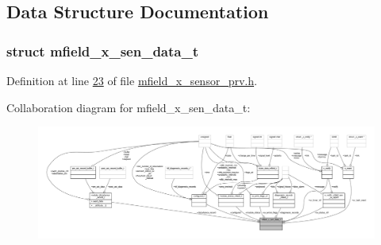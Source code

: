 \subsection{Data Structure Documentation}
\label{d8/de9/a00595}
\hypertarget{a00025_d8/de9/a00595}{}
\subsubsection{struct mfield\+\_\+x\+\_\+sen\+\_\+data\+\_\+t}


Definition at line \hyperlink{a00025_source_l00023}{23} of file \hyperlink{a00025_source}{mfield\+\_\+x\+\_\+sensor\+\_\+prv.\+h}.



Collaboration diagram for mfield\+\_\+x\+\_\+sen\+\_\+data\+\_\+t\+:\nopagebreak
\begin{figure}[H]
\begin{center}
\leavevmode
\includegraphics[width=350pt]{d2/d6e/a00966}
\end{center}
\end{figure}
